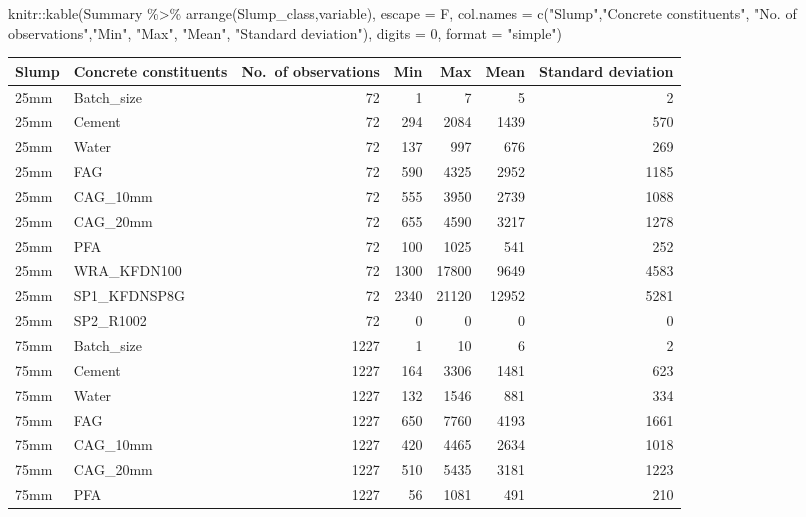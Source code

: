 \documentclass[
]{article}
\newenvironment{Shaded}{\begin{snugshade}}{\end{snugshade}}
\newcommand{\AttributeTok}[1]{\textcolor[rgb]{0.77,0.63,0.00}{#1}}
\newcommand{\DecValTok}[1]{\textcolor[rgb]{0.00,0.00,0.81}{#1}}
\newcommand{\FunctionTok}[1]{\textcolor[rgb]{0.00,0.00,0.00}{#1}}
\newcommand{\NormalTok}[1]{#1}
\newcommand{\SpecialCharTok}[1]{\textcolor[rgb]{0.00,0.00,0.00}{#1}}
\newcommand{\StringTok}[1]{\textcolor[rgb]{0.31,0.60,0.02}{#1}}
\begin{document}
\begin{Shaded}
\begin{Highlighting}[]
\NormalTok{knitr}\SpecialCharTok{::}\FunctionTok{kable}\NormalTok{(Summary }\SpecialCharTok{\%\textgreater{}\%} \FunctionTok{arrange}\NormalTok{(Slump\_class,variable), }\AttributeTok{escape =}\NormalTok{ F,}
             \AttributeTok{col.names =} \FunctionTok{c}\NormalTok{(}\StringTok{"Slump"}\NormalTok{,}\StringTok{"Concrete constituents"}\NormalTok{,}
                           \StringTok{"No. of observations"}\NormalTok{,}\StringTok{"Min"}\NormalTok{, }\StringTok{"Max"}\NormalTok{, }\StringTok{"Mean"}\NormalTok{,}
                           \StringTok{"Standard deviation"}\NormalTok{), }\AttributeTok{digits =} \DecValTok{0}\NormalTok{, }\AttributeTok{format =} \StringTok{"simple"}\NormalTok{)}
\end{Highlighting}
\end{Shaded}

\begin{longtable}[]{@{}llrrrrr@{}}
\toprule()
Slump & Concrete constituents & No.~of observations & Min & Max & Mean &
Standard deviation \\
\midrule()
\endhead
25mm & Batch\_size & 72 & 1 & 7 & 5 & 2 \\
25mm & Cement & 72 & 294 & 2084 & 1439 & 570 \\
25mm & Water & 72 & 137 & 997 & 676 & 269 \\
25mm & FAG & 72 & 590 & 4325 & 2952 & 1185 \\
25mm & CAG\_10mm & 72 & 555 & 3950 & 2739 & 1088 \\
25mm & CAG\_20mm & 72 & 655 & 4590 & 3217 & 1278 \\
25mm & PFA & 72 & 100 & 1025 & 541 & 252 \\
25mm & WRA\_KFDN100 & 72 & 1300 & 17800 & 9649 & 4583 \\
25mm & SP1\_KFDNSP8G & 72 & 2340 & 21120 & 12952 & 5281 \\
25mm & SP2\_R1002 & 72 & 0 & 0 & 0 & 0 \\
75mm & Batch\_size & 1227 & 1 & 10 & 6 & 2 \\
75mm & Cement & 1227 & 164 & 3306 & 1481 & 623 \\
75mm & Water & 1227 & 132 & 1546 & 881 & 334 \\
75mm & FAG & 1227 & 650 & 7760 & 4193 & 1661 \\
75mm & CAG\_10mm & 1227 & 420 & 4465 & 2634 & 1018 \\
75mm & CAG\_20mm & 1227 & 510 & 5435 & 3181 & 1223 \\
75mm & PFA & 1227 & 56 & 1081 & 491 & 210 \\

\end{longtable}
\end{document}
